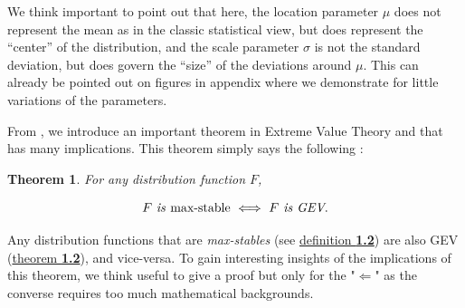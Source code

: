 \documentclass[11pt,a4paper,openany ]{book}
\newtheorem{theorem}{Theorem}[chapter]
\begin{document}
We think important to point out that here, the location parameter $\mu$ does not represent
the mean as in the classic statistical view, but does represent the “center” of the distribution, and the scale parameter
$\sigma$ is not the standard deviation, but does govern the “size” of the deviations around $\mu$. This can already be pointed out on figures in appendix where we demonstrate for little variations of the parameters.
\newline

From \cite{coles_introduction_2001}, we introduce an important theorem in Extreme Value Theory and that has many implications. This theorem simply says the following :

\begin{theorem}\label{max-gev} For any distribution function $F$,
	
	\begin{equation}
	F \ \emph{\text{is \emph{max-stable}}}\ \Longleftrightarrow \ F \emph{\text{ is GEV}}.
	\end{equation}
\end{theorem}
Any distribution functions that are \emph{max-stables} (see \hyperref[maxstab]{ definition \textbf{1.2}}) are also GEV (\hyperref[extthm]{theorem \textbf{1.2}}), and vice-versa.
To gain interesting insights of the implications of this theorem, we think useful to give a proof but only for the "$\Leftarrow$" as the converse requires too much mathematical backgrounds.
\end{document}
